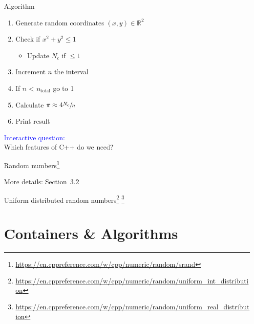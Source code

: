 \documentclass[12pt]{beamer}
\begin{document}
\begin{frame}{Algorithm}
\begin{enumerate}
\item Generate random coordinates $(x,y)\in \mathbb{R}^2$
\item Check if $x^2+y^2 \leq 1$
\begin{itemize}
\item Update $N_c$ if $\leq 1$
\end{itemize}
\item Increment $n$ the interval  
\item If $n$ < $n_{\text{total}}$ go to 1
\item Calculate $\pi \approx 4 \sfrac{N_c}{n}$
\item Print result
\end{enumerate}
\vspace{0.25cm}
\textcolor{blue}{Interactive question:} \\
\vspace{0.125cm}
Which features of C++ do we need? \\
\vspace{0.25cm}
\end{frame}

\begin{frame}{Random numbers\footnote{\tiny\url{https://en.cppreference.com/w/cpp/numeric/random/srand}}}


More details: Section~3.2~\cite{knuth1997art2}
\end{frame}

\begin{frame}{Uniform distributed random numbers\footnote{\tiny\url{https://en.cppreference.com/w/cpp/numeric/random/uniform_int_distribution}} \footnote{\tiny\url{https://en.cppreference.com/w/cpp/numeric/random/uniform_real_distribution}}}



\end{frame}

\section{Containers \& Algorithms}
\end{document}
